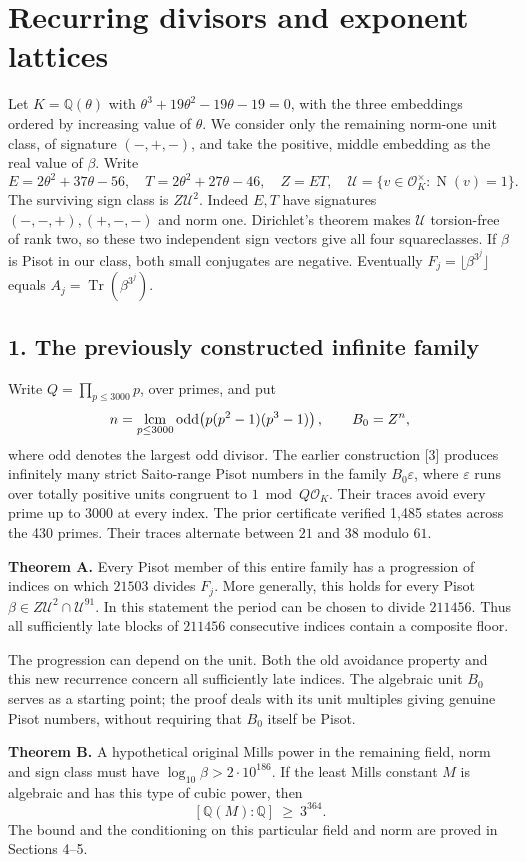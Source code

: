 \documentclass[11pt,a4paper,oneside,openany]{book}
\newcommand{\Q}{\mathbb Q}\newcommand{\C}{\mathbb C}\newcommand{\Z}{\mathbb Z}\newcommand{\F}{\mathbb F}\newcommand{\Tr}{\operatorname{Tr}}\newcommand{\Nm}{\operatorname{N}}\newcommand{\ord}{\operatorname{ord}}\newcommand{\K}{K}\newcommand{\OO}{\mathcal O_K}\newcommand{\unit}{\mathcal U}
\newcommand{\localhead}[1]{\needspace{5\baselineskip}\section*{\color{ink}#1}}
\let\sect\localhead\let\secx\localhead\let\head\localhead
\begin{document}
\chapter{Recurring divisors and exponent lattices}\label{ch:ray}
Let $K=\Q(\theta)$ with $\theta^3+19\theta^2-19\theta-19=0$, with the three embeddings ordered by increasing value of $\theta$. We consider only the remaining norm-one unit class, of signature $(-,+,-)$, and take the positive, middle embedding as the real value of $\beta$. Write
\[
 E=2\theta^2+37\theta-56,\quad T=2\theta^2+27\theta-46,\quad
 Z=ET,\quad \unit=\{v\in\mathcal O_K^\times:\Nm(v)=1\}.
\]
The surviving sign class is $Z\unit^2$. Indeed $E,T$ have signatures $(-,-,+),(+,-,-)$ and norm one. Dirichlet's theorem makes $\unit$ torsion-free of rank two, so these two independent sign vectors give all four squareclasses. If $\beta$ is Pisot in our class, both small conjugates are negative. Eventually $F_j=\lfloor\beta^{3^j}\rfloor$ equals $A_j=\Tr(\beta^{3^j})$.

\sect{1. The previously constructed infinite family}
Write $Q=\prod_{p\le3000}p$, over primes, and put
\[
 n=\mathop{\rm lcm}_{p\le3000}\mathrm{odd}\!\left(p(p^2-1)(p^3-1)\right),
 \qquad  B_0=Z^n ,
\]
where $\mathrm{odd}$ denotes the largest odd divisor. The earlier construction [3] produces infinitely many strict Saito-range Pisot numbers in the family $B_0\varepsilon$, where $\varepsilon$ runs over totally positive units congruent to $1\bmod Q\mathcal O_K$. Their traces avoid every prime up to $3000$ at every index. The prior certificate verified 1,485 states across the 430 primes. Their traces alternate between $21$ and $38$ modulo $61$.

\textbf{Theorem A.} Every Pisot member of this entire family has a progression of indices on which $21503$ divides $F_j$. More generally, this holds for every Pisot $\beta\in Z\unit^2\cap\unit^{91}$. In this statement the period can be chosen to divide $211456$. Thus all sufficiently late blocks of $211456$ consecutive indices contain a composite floor.

The progression can depend on the unit. Both the old avoidance property and this new recurrence concern all sufficiently late indices. The algebraic unit $B_0$ serves as a starting point; the proof deals with its unit multiples giving genuine Pisot numbers, without requiring that $B_0$ itself be Pisot.

\textbf{Theorem B.} A hypothetical original Mills power in the remaining field, norm and sign class must have $\log_{10}\beta>2\cdot10^{186}$. If the least Mills constant $M$ is algebraic and has this type of cubic power, then
\[
                      [\Q(M):\Q]\ \ge\ 3^{364}.
\]
The bound and the conditioning on this particular field and norm are proved in Sections 4--5.
\end{document}
